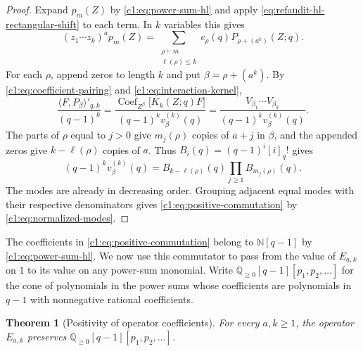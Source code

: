 \documentclass[12pt,reqno,a4paper]{amsart}
\numberwithin{equation}{section}
\numberwithin{figure}{section}
\theoremstyle{plain}
\newtheorem{theorem}{Theorem}[section]
\theoremstyle{definition}
\DeclareMathOperator{\Coef}{Coef}
\begin{document}
\begin{proof}
Expand $p_m(Z)$ by \eqref{c1:eq:power-sum-hl} and apply
\eqref{eq:refaudit-hl-rectangular-shift} to each term.  In $k$ variables this gives
\[
 (z_1\cdots z_k)^a p_m(Z)
 =\sum_{\substack{\rho\vdash m\\\ell(\rho)\leq k}}
    c_\rho(q)P_{\rho+(a^k)}(Z;q).
\]
For each $\rho$, append zeros to length $k$ and put $\beta=\rho+(a^k)$.
By \eqref{c1:eq:coefficient-pairing} and \eqref{c1:eq:interaction-kernel},
\[
 \frac{\langle F,P_\beta\rangle'_{q,k}}{(q-1)^k}
 =\frac{\Coef_{Z^\beta}\bigl[K_k(Z;q)F\bigr]}{(q-1)^k v_\beta^{(k)}(q)}
 =\frac{V_{\beta_1}\cdots V_{\beta_k}}
        {(q-1)^k v_\beta^{(k)}(q)}.
\]
The parts of $\rho$ equal to $j>0$ give $m_j(\rho)$ copies of $a+j$
in $\beta$, and the appended zeros give $k-\ell(\rho)$ copies of $a$.
Thus $B_i(q)=(q-1)^i[i]_q!$ gives
\[
 (q-1)^k v_\beta^{(k)}(q)
 =B_{k-\ell(\rho)}(q)\prod_{j\geq1}B_{m_j(\rho)}(q).
\]
The modes are already in decreasing order.  Grouping adjacent equal
modes with their respective denominators gives
\eqref{c1:eq:positive-commutation} by \eqref{c1:eq:normalized-modes}.
\end{proof}

The coefficients in \eqref{c1:eq:positive-commutation} belong to
$\mathbb N[q-1]$ by \eqref{c1:eq:power-sum-hl}.  We now use this
commutator to pass from the value of $E_{a,k}$ on $1$ to its value on
any power-sum monomial.  Write
$\mathbb Q_{\geq0}[q-1][p_1,p_2,\ldots]$ for the cone of polynomials
in the power sums whose coefficients are polynomials in $q-1$ with
nonnegative rational coefficients.

\begin{theorem}[Positivity of operator coefficients]
\label{c1:thm:mode-positivity}
For every $a,k\geq1$, the operator $E_{a,k}$ preserves
$\mathbb Q_{\geq0}[q-1][p_1,p_2,\ldots]$.
\end{theorem}
\end{document}
